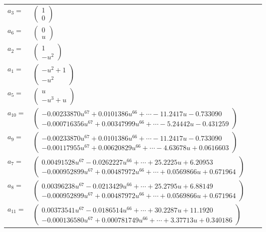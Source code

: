 \documentclass[1p]{elsarticle_modified}
\theoremstyle{definition}
\begin{document}
\begin{tabular}{m{7pt} m{180pt} m{7pt} m{180pt} }
\flushright $a_{3}=$&$\begin{pmatrix}1\\0\end{pmatrix}$ \\
\flushright $a_{6}=$&$\begin{pmatrix}0\\u\end{pmatrix}$ \\
\flushright $a_{2}=$&$\begin{pmatrix}1\\- u^2\end{pmatrix}$ \\
\flushright $a_{1}=$&$\begin{pmatrix}- u^2+1\\- u^2\end{pmatrix}$ \\
\flushright $a_{5}=$&$\begin{pmatrix}u\\- u^3+u\end{pmatrix}$ \\
\flushright $a_{10}=$&$\begin{pmatrix}-0.00233870 u^{67}+0.0101386 u^{66}+\cdots-11.2417 u-0.733090\\-0.000716356 u^{67}+0.00347999 u^{66}+\cdots-5.24442 u-0.431259\end{pmatrix}$ \\
\flushright $a_{9}=$&$\begin{pmatrix}-0.00233870 u^{67}+0.0101386 u^{66}+\cdots-11.2417 u-0.733090\\-0.00117955 u^{67}+0.00620829 u^{66}+\cdots-4.63678 u+0.0616603\end{pmatrix}$ \\
\flushright $a_{7}=$&$\begin{pmatrix}0.00491528 u^{67}-0.0262227 u^{66}+\cdots+25.2225 u+6.20953\\-0.000952899 u^{67}+0.00487972 u^{66}+\cdots+0.0569866 u+0.671964\end{pmatrix}$ \\
\flushright $a_{8}=$&$\begin{pmatrix}0.00396238 u^{67}-0.0213429 u^{66}+\cdots+25.2795 u+6.88149\\-0.000952899 u^{67}+0.00487972 u^{66}+\cdots+0.0569866 u+0.671964\end{pmatrix}$ \\
\flushright $a_{11}=$&$\begin{pmatrix}0.00373541 u^{67}-0.0186514 u^{66}+\cdots+30.2287 u+11.1920\\-0.000136580 u^{67}+0.000781749 u^{66}+\cdots+3.37713 u+0.340186\end{pmatrix}$ \\

\end{tabular}
\end{document}
